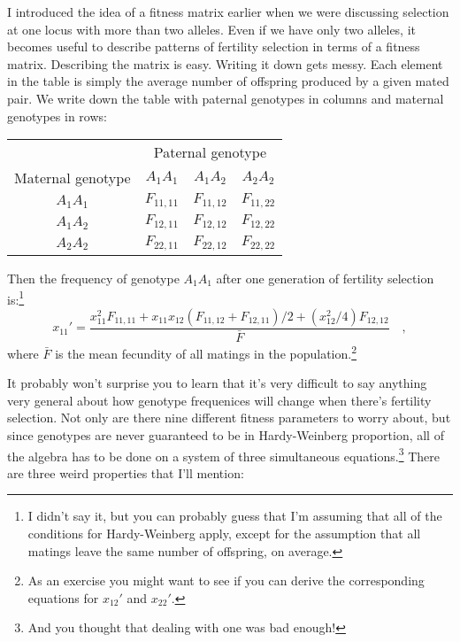 \documentclass[12pt]{article}
\begin{document}
I introduced the idea of a fitness matrix earlier when we were
discussing selection at one locus with more than two alleles. Even if
we have only two alleles, it becomes useful to describe patterns of
fertility selection in terms of a fitness matrix. Describing the
matrix is easy. Writing it down gets messy. Each element in the table
is simply the average number of offspring produced by a given mated
pair. We write down the table with paternal genotypes in columns and
maternal genotypes in rows:
\begin{center}
\begin{tabular}{c|ccc}
\hline\hline
                  & \multicolumn{3}{c}{Paternal genotype} \\
Maternal genotype & $A_1A_1$ & $A_1A_2$ & $A_2A_2$ \\
\hline
$A_1A_1$ & $F_{11,11}$ & $F_{11,12}$ & $F_{11,22}$ \\
$A_1A_2$ & $F_{12,11}$ & $F_{12,12}$ & $F_{12,22}$ \\
$A_2A_2$ & $F_{22,11}$ & $F_{22,12}$ & $F_{22,22}$ \\
\hline
\end{tabular}
\end{center}
Then the frequency of genotype $A_1A_1$ after one generation of
fertility selection is:\footnote{I didn't say it, but you can probably
  guess that I'm assuming that all of the conditions for
  Hardy-Weinberg apply, except for the assumption that all matings
  leave the same number of offspring, on average.}
\begin{equation}
x_{11}' = \frac{x_{11}^2F_{11,11} + x_{11}x_{12}(F_{11,12} +
                F_{12,11})/2 + (x_{12}^2/4)F_{12,12}}{\bar F} \quad ,
\label{eq:fertility}
\end{equation}
where $\bar F$ is the mean fecundity of all matings in the
population.\footnote{As an exercise you might want to see if you can
derive the corresponding equations for $x_{12}'$ and $x_{22}'$.} 

It probably won't surprise you to learn that it's very difficult to
say anything very general about how genotype frequenices will change
when there's fertility selection. Not only are there nine different
fitness parameters to worry about, but since genotypes are never
guaranteed to be in Hardy-Weinberg proportion, all of the algebra has
to be done on a system of three simultaneous equations.\footnote{And
you thought that dealing with one was bad enough!} There are three
weird properties that I'll mention:
\end{document}
